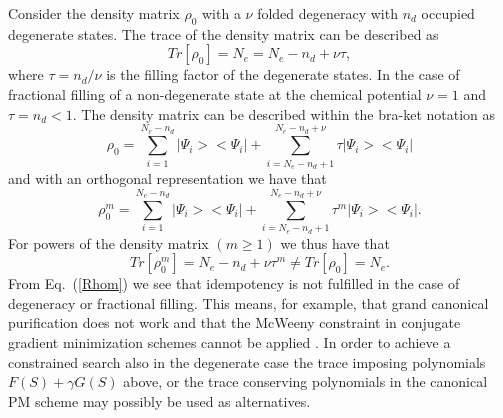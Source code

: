 \commentoutA{\documentclass[prb,aps,twocolumn,twocolumngrid,secnumarabic,superbib,hyperref]{revtex4}}
\begin{document}
Consider the density matrix $\rho_0$  with a $\nu$ folded degeneracy
with $n_d$ occupied degenerate states. The trace of the density matrix
can be described as
\begin{equation}
Tr [ \rho_0  ] = N_e = N_e-n_d + \nu \tau,
\end{equation}
where $\tau = n_d/\nu$ is the filling factor of the degenerate states.
In the case of fractional filling of a non-degenerate state at the
chemical potential $\nu = 1$ and $\tau = n_d < 1$.
The density matrix can be described within the bra-ket notation as
\begin{equation}
\rho_0 = \sum_{ i=1 }^{ N_e - n_d } |\Psi_i >< \Psi_i | + 
\sum_{ i= N_e - n_d + 1 }^{ N_e - n_d + \nu } \tau | \Psi_i> < \Psi_i |
\end{equation}
and with an orthogonal representation we have that
\begin{equation}
\rho_0^m = \sum_{i=1}^{N_e-n_d} |\Psi_i><\Psi_i| + 
\sum_{i=N_e-n_d + 1}^{N_e - n_d +\nu} \tau^m |\Psi_i><\Psi_i|.
\end{equation}
For powers of the density matrix $(m \geq 1)$ we thus have that
\begin{equation} \label{Rhom}
Tr [ \rho_0^m  ] = N_e - n_d + \nu \tau^m \neq Tr  [ \rho_0  ] = N_e.
\end{equation}
From Eq.\ (\ref{Rhom}) we see that idempotency is not
fulfilled in the case of degeneracy or fractional filling. 
This means, for example, that grand canonical purification does not work and
that the McWeeny constraint in conjugate gradient
minimization schemes cannot be applied \cite{Li93}.
In order to achieve a constrained search also
in the degenerate case the trace imposing polynomials
$F(S) + \gamma G(S)$ above, or the trace conserving polynomials
in the canonical PM scheme may possibly be used as alternatives.
\end{document}
